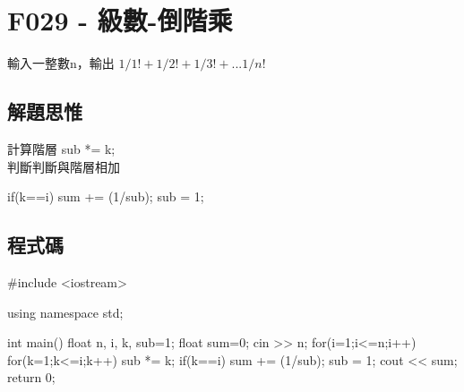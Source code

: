 \section{F029 - 級數-倒階乘}
輸入一整數n，輸出 $1/1!+1/2!+1/3!+...1/n!$
\subsection{解題思惟}
計算階層 sub *= k;\\
判斷判斷與階層相加 
\begin{inside}
if(k==i) {
	sum += (1/sub);
	sub = 1;
}
\end{inside}
\subsection{程式碼}
\begin{cppcode}
#include <iostream>

using namespace std;

int main()
{
	float n, i, k, sub=1;
	float sum=0;
	cin >> n;
	for(i=1;i<=n;i++) {
		for(k=1;k<=i;k++) {
			sub *= k;
			if(k==i) {
				sum += (1/sub);
				sub = 1;
			}
		}
	}
	cout << sum;
	return 0;
}
\end{cppcode}
